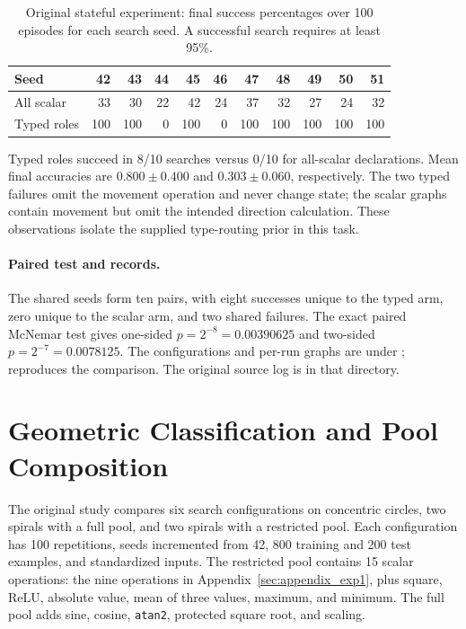 \begin{table}[tb]
\centering\small
\caption{Original stateful experiment: final success percentages over 100
episodes for each search seed. A successful search requires at least 95\%.}
\label{tab:stateful_per_run}
\begin{tabular}{lrrrrrrrrrr}
\toprule
Seed & 42 & 43 & 44 & 45 & 46 & 47 & 48 & 49 & 50 & 51 \\
\midrule
All scalar & 33 & 30 & 22 & 42 & 24 & 37 & 32 & 27 & 24 & 32 \\
Typed roles & 100 & 100 & 0 & 100 & 0 & 100 & 100 & 100 & 100 & 100 \\
\bottomrule
\end{tabular}
\end{table}

Typed roles succeed in 8/10 searches versus 0/10 for all-scalar declarations.
Mean final accuracies are $0.800\pm0.400$ and $0.303\pm0.060$, respectively.
The two typed failures omit the movement operation and never change state;
the scalar graphs contain movement but omit the intended direction calculation.
These observations isolate the supplied type-routing prior in this task.

\paragraph{Paired test and records.}
\label{sec:paired_test}
The shared seeds form ten pairs, with eight successes unique to the typed arm,
zero unique to the scalar arm, and two shared failures. The exact paired
McNemar test gives one-sided $p=2^{-8}=0.00390625$ and two-sided
$p=2^{-7}=0.0078125$. The configurations and per-run graphs are under
;
 reproduces the comparison. The original source log is
 in that directory.

\section{Geometric Classification and Pool Composition}
\label{sec:appendix_geo_ablation}
The original study compares six search configurations on concentric circles,
two spirals with a full pool, and two spirals with a restricted pool. Each
configuration has 100 repetitions, seeds incremented from 42, 800 training
and 200 test examples, and standardized inputs. The restricted pool contains
15 scalar operations: the nine operations in Appendix~\ref{sec:appendix_exp1},
plus square, ReLU, absolute value, mean of three values, maximum, and minimum.
The full pool adds sine, cosine, \texttt{atan2}, protected square root, and scaling.

